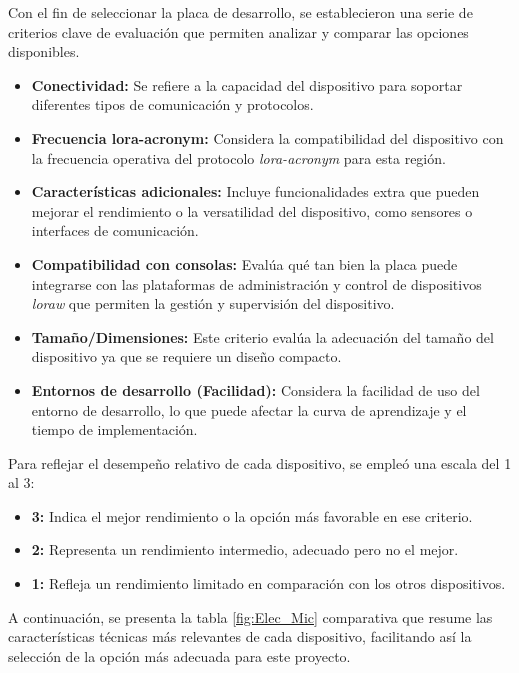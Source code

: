 Con el fin de seleccionar la placa de desarrollo, se establecieron una serie de criterios clave de evaluación que permiten analizar y comparar las opciones disponibles.

\begin{itemize}
    \item \textbf{Conectividad:} Se refiere a la capacidad del dispositivo para soportar diferentes tipos de comunicación y protocolos.
    \item \textbf{Frecuencia \acrshort{lora-acronym}:} Considera la compatibilidad del dispositivo con la frecuencia operativa del protocolo \textit{\acrshort{lora-acronym}} para esta región.
    \item \textbf{Características adicionales:} Incluye funcionalidades extra que pueden mejorar el rendimiento o la versatilidad del dispositivo, como sensores o interfaces de comunicación.
    \item \textbf{Compatibilidad con consolas:} Evalúa qué tan bien la placa puede integrarse con las plataformas de administración y control de dispositivos \textit{\acrshort{loraw}} que permiten la gestión y supervisión del dispositivo.
    \item \textbf{Tamaño/Dimensiones:} Este criterio evalúa la adecuación del tamaño del dispositivo ya que se requiere un diseño compacto.
    \item \textbf{Entornos de desarrollo (Facilidad):} Considera la facilidad de uso del entorno de desarrollo, lo que puede afectar la curva de aprendizaje y el tiempo de implementación.
\end{itemize}

Para reflejar el desempeño relativo de cada dispositivo, se empleó una escala del 1 al 3:

\begin{itemize}
    \item \textbf{3:} Indica el mejor rendimiento o la opción más favorable en ese criterio.
    \item \textbf{2:} Representa un rendimiento intermedio, adecuado pero no el mejor.
    \item \textbf{1:} Refleja un rendimiento limitado en comparación con los otros dispositivos.
\end{itemize}
A continuación, se presenta la tabla \ref{fig:Elec_Mic} comparativa que resume las características técnicas más relevantes de cada dispositivo, facilitando así la selección de la opción más adecuada para este proyecto.

